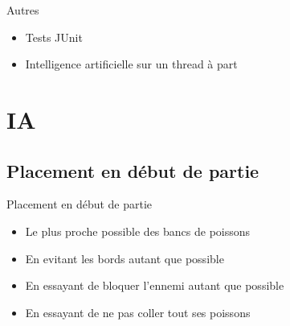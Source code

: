 \documentclass{beamer}
\begin{document}
\begin{frame}{}
\begin{block}{Autres}
\begin{itemize}
\item<1-> Tests JUnit
\item<2-> Intelligence artificielle sur un thread à part
\end{itemize}
\end{block}
\end{frame}


\section{IA}

\subsection{Placement en début de partie}
\begin{frame}{}
\begin{block}{Placement en début de partie}
\begin{itemize}
 \item<1-> Le plus proche possible des bancs de poissons
 \item<2-> En evitant les bords autant que possible
 \item<3-> En essayant de bloquer l'ennemi autant que possible
 \item<4-> En essayant de ne pas coller tout ses poissons
\end{itemize}
\end{block}
\end{frame}
\end{document}
